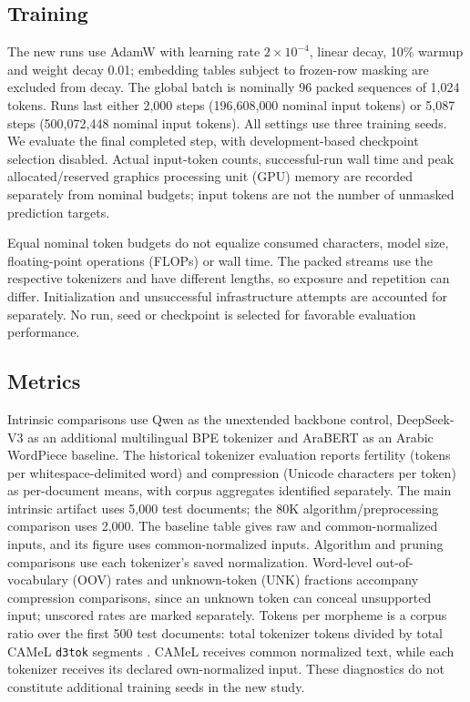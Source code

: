 \documentclass{ieeeaccess}
\begin{document}
\subsection{Training}

The new runs use AdamW with learning rate $2\times10^{-4}$, linear decay, 10\% warmup and weight decay 0.01; embedding tables subject to frozen-row masking are excluded from decay. The global batch is nominally 96 packed sequences of 1{,}024 tokens. Runs last either 2{,}000 steps (196{,}608{,}000 nominal input tokens) or 5{,}087 steps (500{,}072{,}448 nominal input tokens). All settings use three training seeds. We evaluate the final completed step, with development-based checkpoint selection disabled. Actual input-token counts, successful-run wall time and peak allocated/reserved graphics processing unit (GPU) memory are recorded separately from nominal budgets; input tokens are not the number of unmasked prediction targets.

Equal nominal token budgets do not equalize consumed characters, model size, floating-point operations (FLOPs) or wall time. The packed streams use the respective tokenizers and have different lengths, so exposure and repetition can differ. Initialization and unsuccessful infrastructure attempts are accounted for separately. No run, seed or checkpoint is selected for favorable evaluation performance.

\subsection{Metrics}
\label{sec:metrics}

Intrinsic comparisons use Qwen as the unextended backbone control, DeepSeek-V3 as an additional multilingual BPE tokenizer and AraBERT \cite{antoun2020arabert} as an Arabic WordPiece baseline. The historical tokenizer evaluation reports fertility (tokens per whitespace-delimited word) and compression (Unicode characters per token) as per-document means, with corpus aggregates identified separately. The main intrinsic artifact uses 5{,}000 test documents; the 80K algorithm/preprocessing comparison uses 2{,}000. The baseline table gives raw and common-normalized inputs, and its figure uses common-normalized inputs. Algorithm and pruning comparisons use each tokenizer's saved normalization. Word-level out-of-vocabulary (OOV) rates and unknown-token (UNK) fractions accompany compression comparisons, since an unknown token can conceal unsupported input; unscored rates are marked separately. Tokens per morpheme is a corpus ratio over the first 500 test documents: total tokenizer tokens divided by total CAMeL \texttt{d3tok} segments \cite{obeid2020camel}. CAMeL receives common normalized text, while each tokenizer receives its declared own-normalized input. These diagnostics do not constitute additional training seeds in the new study.
\end{document}

